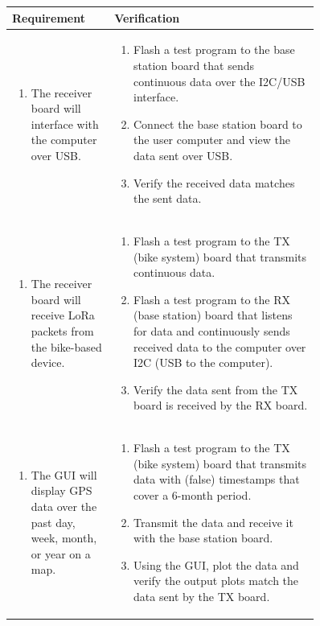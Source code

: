 \documentclass{article}
\begin{document}
\begin{figure}[H]
	\begin{center}
		\begin{tabular}{|p{0.3 \linewidth}|p{0.6 \linewidth}|}
			\hline
			Requirement & Verification  \\
			\hline 
			\begin{enumerate}
				\item  The receiver board will interface with the computer over USB.
			\end{enumerate}  & \begin{enumerate}
				\item Flash a test program to the base station board that sends continuous data over the I2C/USB interface.
				\item Connect the base station board to the user computer and view the data sent over USB. 
				\item Verify the received data matches the sent data. 
			\end{enumerate} \\
			\hline
			\begin{enumerate}
				\item The receiver board will receive LoRa packets from the bike-based device. 
			\end{enumerate}  & \begin{enumerate}
				\item Flash a test program to the TX (bike system) board that transmits continuous data. 
				\item Flash a test program to the RX (base station) board that listens for data and continuously sends received data to the computer over I2C (USB to the computer). 
				\item Verify the data sent from the TX board is received by the RX board.
			\end{enumerate} \\
			\hline
			\begin{enumerate}
				\item The GUI will display GPS data over the past day, week, month, or year on a map. 
			\end{enumerate}  & \begin{enumerate}
				\item Flash a test program to the TX (bike system) board that transmits data with (false) timestamps that cover a 6-month period. 
				\item Transmit the data and receive it with the base station board. 
				\item Using the GUI, plot the data and verify the output plots match the data sent by the TX board. 

\end{enumerate}
\end{tabular}
\end{center}
\end{figure}
\end{document}
